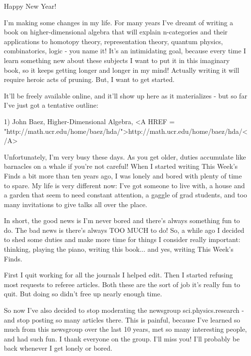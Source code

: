 


Happy New Year!

I'm making some changes in my life.  For many years I've dreamt 
of writing a book on higher-dimensional algebra that will explain
n-categories and their applications to homotopy theory, representation 
theory, quantum physics, combinatorics, logic - you name it!  It's an 
intimidating goal, because every time I learn something new about these 
subjects I want to put it in this imaginary book, so it keeps getting 
longer and longer in my mind!  Actually writing it will require heroic 
acts of pruning.  But, I want to get started.  

It'll be freely available online, and it'll show up here as it
materializes - but so far I've just got a tentative outline:

1) John Baez, Higher-Dimensional Algebra, 
<A HREF = "http://math.ucr.edu/home/baez/hda/">http://math.ucr.edu/home/baez/hda/</A>

Unfortunately, I'm very busy these days.  As you get older, duties 
accumulate like barnacles on a whale if you're not careful!  When I 
started writing This Week's Finds a bit more than ten years ago, I 
was lonely and bored with plenty of time to spare.  My life is very 
different now: I've got someone to live with, a house and a garden 
that seem to need constant attention, a gaggle of grad students, and 
too many invitations to give talks all over the place.

In short, the good news is I'm never bored and there's always something 
fun to do.  The bad news is there's always TOO MUCH to do!  So, a while 
ago I decided to shed some duties and make more time for things I consider 
really important: thinking, playing the piano, writing this book... 
and yes, writing This Week's Finds. 
 
First I quit working for all the journals I helped edit.  Then I started 
refusing most requests to referee articles.  Both these are the sort of 
job it's really fun to quit.  But doing so didn't free up nearly enough 
time.  

So now I've also decided to stop moderating the newsgroup 
sci.physics.research - and stop posting so many articles there.
This is painful, because I've learned so much from this newsgroup over 
the last 10 years, met so many interesting people, and had such fun. 
I thank everyone on the group.  I'll miss you!  I'll probably be back
whenever I get lonely or bored.

